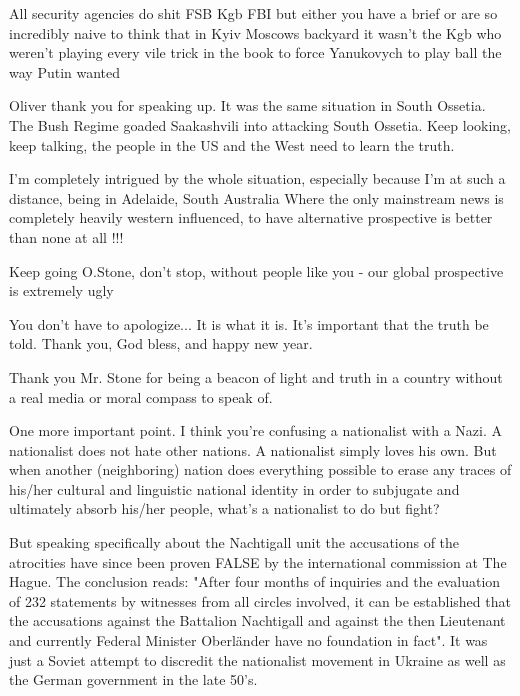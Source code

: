 \begin{itemize}
All security agencies do shit FSB Kgb FBI but either you have a brief or are so
incredibly naive to think that in Kyiv Moscows backyard it wasn't the Kgb who
weren't playing every vile trick in the book to force Yanukovych to play ball
the way Putin wanted


Oliver thank you for speaking up. It was the same situation in South Ossetia.
The Bush Regime goaded Saakashvili into attacking South Ossetia. Keep looking,
keep talking, the people in the US and the West need to learn the truth.


I'm completely intrigued by the whole situation, especially because I'm at such
a distance, being in Adelaide, South Australia Where the only mainstream news
is completely heavily western influenced, to have alternative prospective is
better than none at all !!!

Keep going O.Stone, don't stop, without people like you - our global
prospective is extremely ugly


You don't have to apologize... It is what it is. It's important that the truth
be told. Thank you, God bless, and happy new year.


Thank you Mr. Stone for being a beacon of light and truth in a country without
a real media or moral compass to speak of.


One more important point. I think you're confusing a nationalist with a Nazi. A
nationalist does not hate other nations. A nationalist simply loves his own.
But when another (neighboring) nation does everything possible to erase any
traces of his/her cultural and linguistic national identity in order to
subjugate and ultimately absorb his/her people, what's a nationalist to do but
fight?

But speaking specifically about the Nachtigall unit the accusations of the
atrocities have since been proven FALSE by the international commission at The
Hague. The conclusion reads: "After four months of inquiries and the evaluation
of 232 statements by witnesses from all circles involved, it can be established
that the accusations against the Battalion Nachtigall and against the then
Lieutenant and currently Federal Minister Oberländer have no foundation in
fact". It was just a Soviet attempt to discredit the nationalist movement in
Ukraine as well as the German government in the late 50's.


\end{itemize}
